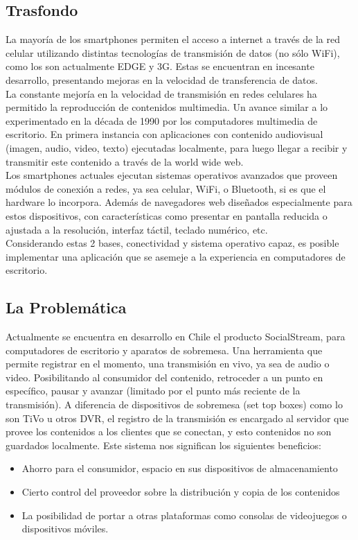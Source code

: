 \subsection{Trasfondo}

La mayoría de los smartphones permiten el acceso a internet a través de la red celular utilizando distintas tecnologías de transmisión de datos (no sólo WiFi), como los son actualmente EDGE y 3G. Estas se encuentran en incesante desarrollo, presentando mejoras en la velocidad de transferencia de datos.\\

La constante mejoría en la velocidad de transmisión en redes celulares ha permitido la reproducción de contenidos multimedia. Un avance similar a lo experimentado en la década de 1990 por los computadores multimedia de escritorio. En primera instancia con aplicaciones con contenido audiovisual (imagen, audio, video, texto) ejecutadas localmente, para luego llegar a recibir y transmitir este contenido a través de la world wide web.\\

Los smartphones actuales ejecutan sistemas operativos avanzados que proveen módulos de conexión  a redes, ya sea celular, WiFi, o Bluetooth, si es que el hardware lo incorpora. Además de navegadores web diseñados especialmente para estos dispositivos, con características como presentar en pantalla reducida o ajustada a la resolución, interfaz táctil, teclado numérico, etc.\\

Considerando estas 2 bases, conectividad y sistema operativo capaz, es posible implementar una aplicación que se asemeje a la experiencia en computadores de escritorio.\\


\subsection{La Problemática}
Actualmente se encuentra en desarrollo en Chile el producto SocialStream, para computadores de escritorio y aparatos de sobremesa. 
Una herramienta que permite registrar en el momento, una transmisión en vivo, ya sea de audio o video. Posibilitando al consumidor del contenido, retroceder a un punto en específico, pausar  y avanzar (limitado por el punto más reciente de la transmisión). 
A diferencia de dispositivos de sobremesa (set top boxes) como lo son TiVo u otros DVR, el registro de la transmisión es encargado al servidor que provee los contenidos a los clientes que se conectan, y esto contenidos no son guardados localmente.
Este sistema nos significan los siguientes beneficios: 
\begin{itemize}
\item Ahorro para el consumidor, espacio en sus dispositivos de almacenamiento
\item Cierto control del proveedor sobre la distribución  y copia de los contenidos
\item La posibilidad de portar a otras plataformas como consolas de videojuegos o dispositivos móviles.
\end{itemize}

